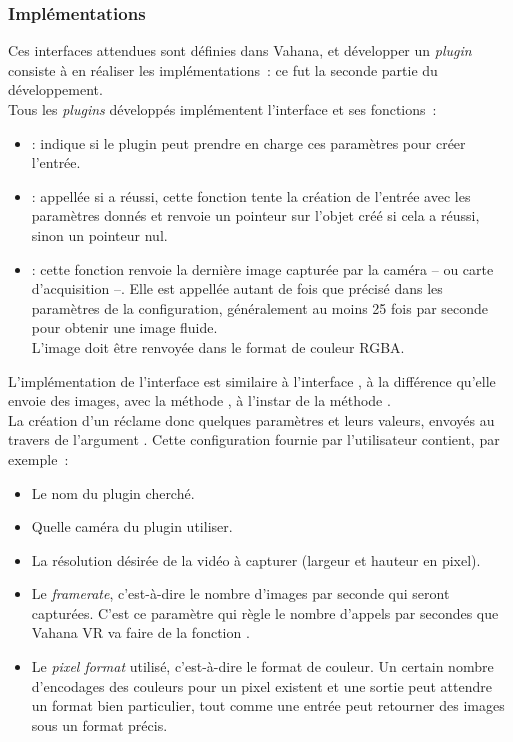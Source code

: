 \subsubsection{Implémentations}
Ces interfaces attendues sont définies dans Vahana, et développer un \textit{plugin} consiste
à en réaliser les implémentations~: ce fut la seconde partie du développement.\\
Tous les \textit{plugins} développés implémentent l'interface 
et ses fonctions~:
\begin{itemize}
  \item {} : indique si le
  plugin peut prendre en charge ces paramètres pour créer l'entrée.
  \item {} : appellée si 
  a réussi, cette fonction tente la création de l'entrée avec les paramètres donnés
  et renvoie un pointeur sur l'objet  créé si cela a réussi, sinon
  un pointeur nul.
  \item {} : cette fonction renvoie la
  dernière image capturée par la caméra -- ou carte d'acquisition --. Elle est
  appellée autant de fois que précisé dans les paramètres de la configuration,
  généralement au moins 25 fois par seconde pour obtenir une image fluide.\\
  L'image doit être renvoyée dans le format de couleur RGBA.
\end{itemize}
L'implémentation de l'interface  est similaire à l'interface ,
à la différence qu'elle envoie des images, avec la méthode , 
à l'instar de la méthode .\\
\newline
La création d'un  réclame donc quelques paramètres et leurs valeurs, envoyés 
au travers de l'argument . Cette configuration fournie par
l'utilisateur contient, par exemple~:
\begin{itemize}
  \item Le nom du plugin cherché.
  \item Quelle caméra du plugin utiliser.
  \item La résolution désirée de la vidéo à capturer (largeur et hauteur en pixel).
  \item Le \textit{framerate}, c'est-à-dire le nombre d'images par seconde qui 
  seront capturées. C'est ce paramètre qui règle le nombre 
  d'appels par secondes que Vahana VR va faire de la fonction .
  \item Le \textit{pixel format} utilisé, c'est-à-dire le format de couleur. Un 
  certain nombre d'encodages des couleurs pour un pixel existent et une sortie peut attendre un
  format bien particulier, tout comme une entrée peut retourner des images sous un
  format précis.
\end{itemize}
